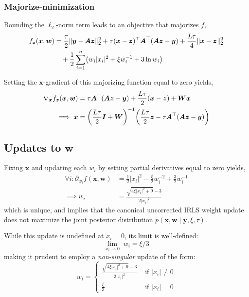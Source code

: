 \documentclass{article}
\numberwithin{equation}{section}
\newcommand{\lh}{\mathopen{}\mathclose\bgroup\left}
\newcommand{\rh}{\aftergroup\egroup\right}
\newcommand{\m}[1]{\boldsymbol{#1}}
\begin{document}
\subsubsection{Majorize-minimization}
Bounding the $\ell_2$-norm term leads to an objective that majorizes $f$,
\begin{equation}
\begin{aligned}
f_{\m{z}}(\m{x}, \m{w}) &=
 \frac{\tau}{2} \| \m{y} - \m{A} \m{z} \|_2^2 +
 \tau (\m{x} - \m{z})^\top \m{A}^\top (\m{A} \m{z} - \m{y})
   +\frac{L \tau}{4} \| \m{x} - \m{z} \|_2^2
\\ &\quad
 +\frac{1}{2} \sum_{i=1}^n \lh( w_i |x_i|^2 + \xi w_i^{-1} + 3 \ln w_i \rh)
\end{aligned}
\end{equation}

Setting the $\m{x}$-gradient of this majorizing function equal to
zero yields,
\begin{equation}
\begin{aligned}
\nabla_{\m{x}} f_{\m{z}}(\m{x}, \m{w}) &=
 \tau \m{A}^\top (\m{A} \m{z} - \m{y}) +
 \frac{L \tau}{2} (\m{x} - \m{z}) +
 \m{W} \m{x}
\\ \implies
\m{x} &=
 \lh( \frac{L \tau}{2} \m{I} + \m{W} \rh)^{-1} \lh(
  \frac{L \tau}{2} \m{z} -  \tau \m{A}^\top (\m{A} \m{z} - \m{y})
 \rh)
\end{aligned}
\end{equation}

\subsection{Updates to $\m{w}$}
Fixing $\m{x}$ and updating each $w_i$ by setting partial derivatives
equal to zero yields,
\begin{equation}
\begin{aligned}
\forall i:
\partial_{w_i} f(\m{x}, \m{w}) &=
 \frac{1}{2} |x_i|^2 - \frac{\xi}{2} w_i^{-2} + \frac{3}{2} w_i^{-1}
\\ \implies
 w_i &= \frac{\sqrt{4 \xi |x_i|^2 + 9} - 3}{2 |x_i|^2}
\end{aligned}
\end{equation}
which is unique, and implies that the canonical uncorrected IRLS weight
update does not maximize the joint posterior distribution
$p(\m{x}, \m{w} \mid \m{y}, \xi, \tau)$.

While this update is undefined at $x_i = 0$, its limit is well-defined:
\begin{equation}
\underset{x_i \to 0}{\lim} \; w_i = \xi/3
\end{equation}
making it prudent to employ a \emph{non-singular} update of the form:
\begin{equation}
w_i = \begin{cases}
 \frac{\sqrt{4 \xi |x_i|^2 + 9} - 3}{2 |x_i|^2} & \text{ if } |x_i| \ne 0
\\
 \frac{\xi}{3} & \text{ if } |x_i| = 0
\end{cases}
\end{equation}
\end{document}
